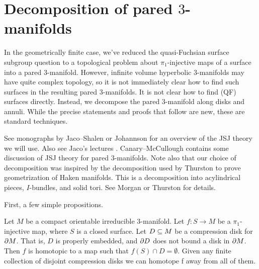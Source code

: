 \section{Decomposition of pared $3$-manifolds}

In the geometrically finite case, we've reduced the quasi-Fuchsian surface
subgroup question to a topological problem about $\pi_1$-injective maps of
a surface into a pared $3$-manifold. However, infinite volume hyperbolic
$3$-manifolds may have quite complex topology, so it is not immediately clear
how to find such surfaces in the resulting pared $3$-manifolds. It is not clear
how to find (QF) surfaces directly. Instead, we decompose the pared
$3$-manifold along disks and annuli. While the precise statements and proofs
that follow are new, these are standard techniques.

See monographs by Jaco--Shalen \cite{JacoShalen} or Johannson \cite{Johannson}
for an overview of the JSJ theory we will use. Also see Jaco's lectures
\cite{Ja}. Canary--McCullough \cite{CMc} contains some discussion of JSJ theory
for pared $3$-manifolds.  Note also that our choice of decomposition was
inspired by the decomposition used by Thurston to prove geometrization of Haken
manifolds.  This is a decomposition into acylindrical pieces, $I$-bundles, and
solid tori.  See Morgan \cite{Mo} or Thurston \cite{ThurstonIII} for details.

First, a few simple propositions.

\begin{prop}\label{P:avoiddisk}

Let $M$ be a compact orientable irreducible $3$-manifold. Let $f \colon S \to
M$ be a $\pi_1$-injective map, where $S$ is a closed surface.  Let $D \subseteq M$
be a compression disk for $\partial M$. That is, $D$ is properly embedded, and $\partial
D$ does not bound a disk in $\partial M$. Then $f$ is homotopic to a map such that
$f(S) \cap D = \emptyset$. Given any finite collection of disjoint compression
disks we can homotope f away from all of them.

\end{prop}

